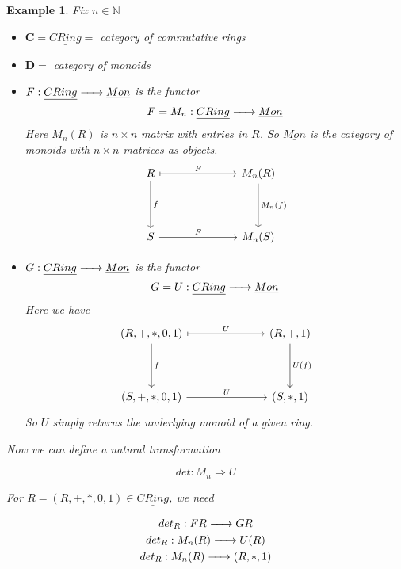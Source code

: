 \documentclass{article}
\newtheorem{example}{Example}[section]
\renewcommand{\to}{\xrightarrow{\hspace{0.5cm}}}  %
\begin{document}
    \vspace{0.2in}

    \newpage

    \begin{example}
        Fix \(n \in \mathbb{N}\)

        \begin{itemize}
            \item \(\mathbf{C} = \underline{CRing} = \) category of commutative rings
            \item \(\mathbf{D} = \) category of monoids
            \item \(F: \underline{CRing} \to \underline{Mon}\) is the functor
            \[
                F = M_n: \underline{CRing} \to \underline{Mon}
            \]
            Here \(M_n(R)\) is \(n \times n\) matrix with entries in \(R\). So \(\underline{Mon}\) is
            the category of monoids with \(n \times n\) matrices as objects.
            \[
                \begin{tikzcd}[column sep=7em, row sep=4em]
                    R \arrow[r, mapsto,  "F"] \arrow[d, "f"]
                    & M_n(R) \arrow[d, "M_n(f)"] \\
                    S \arrow[r, "F"]
                    & M_n(S)
                \end{tikzcd}
            \]
            \item \(G: \underline{CRing} \to \underline{Mon}\) is the functor
            \[
                G = U: \underline{CRing} \to \underline{Mon}
            \]
            Here we have
            \[
                \begin{tikzcd}[column sep=7em, row sep=4em]
                (R,+, *, 0, 1)
                    \arrow[r, mapsto,  "U"] \arrow[d, "f"]
                    & (R, +, 1) \arrow[d, "U(f)"] \\
                    (S,+, *, 0, 1) \arrow[r, "U"]
                    & (S, *, 1)
                \end{tikzcd}
            \]
            So \(U\) simply returns the underlying monoid of a given ring.
        \end{itemize}

        Now we can define a natural transformation

        \[
            det : M_n \Longrightarrow U
        \]

        For \(R = (R, +, *, 0, 1) \in \underline{CRing}\), we need

        \begin{gather*}
            det_R: FR \to GR\\
            det_R: M_n(R) \to U(R)\\
            det_R: M_n(R) \to (R, *, 1)\\
        \end{gather*}


\end{example}
\end{document}
